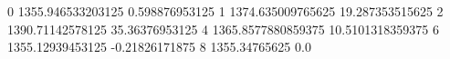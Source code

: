 0 1355.946533203125 0.598876953125
1 1374.635009765625 19.287353515625
2 1390.71142578125 35.36376953125
4 1365.8577880859375 10.5101318359375
6 1355.12939453125 -0.21826171875
8 1355.34765625 0.0
